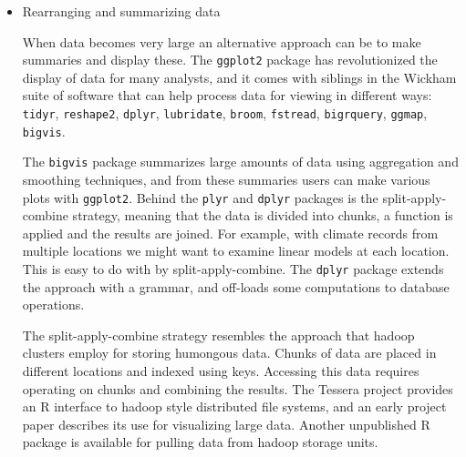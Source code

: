\documentclass{article}
\begin{document}
\begin{itemize}
\item Rearranging and summarizing data 

When data becomes very large an alternative approach can be to make summaries and display these. The {\tt ggplot2} package has revolutionized the display of data for many analysts, and it comes with siblings in the Wickham suite of software that can help process data for viewing in different ways: {\tt tidyr}, {\tt reshape2}, {\tt dplyr}, {\tt lubridate}, {\tt broom}, {\tt fstread}, {\tt bigrquery}, {\tt ggmap}, {\tt bigvis}.

The {\tt bigvis} package \citep{bigvis} summarizes large amounts of data using aggregation and smoothing techniques, and from these summaries users can make various plots with {\tt ggplot2}. Behind the {\tt plyr} \citep{plyr} and {\tt dplyr} \citep{dplyr} packages is the split-apply-combine strategy, meaning that the data is divided into chunks, a function is applied and the results are joined. For example, with climate records from multiple locations we might want to examine linear models at each location. This is easy to do with by split-apply-combine. The {\tt dplyr} package extends the approach with a grammar, and off-loads some computations to database operations.

The split-apply-combine strategy resembles the approach that hadoop \citep{hadoop} clusters employ for storing humongous data. Chunks of data are placed in different locations and indexed using keys. Accessing this data requires operating on chunks and combining the results. The Tessera project \citep{tessera} provides an R interface to hadoop style distributed file systems, and an early project paper \citep{guha} describes its use for visualizing large data. Another unpublished R package \citep{urbanek} is available for pulling data from hadoop storage units.



\end{itemize}
\end{document}
